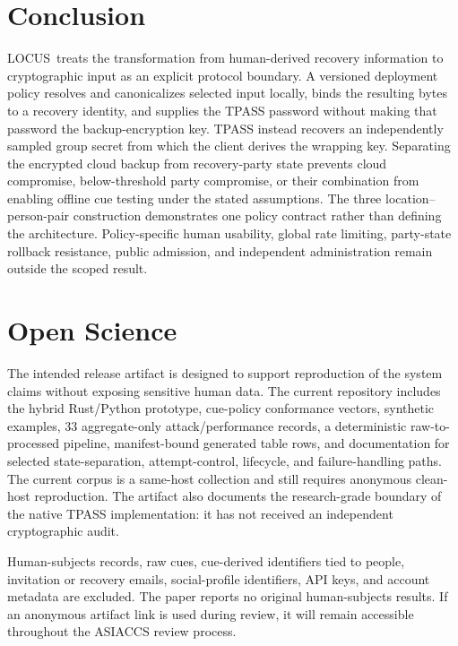 \documentclass[sigconf,anonymous]{acmart}
\newcounter{protocol}
\newcommand{\LOCUS}{\textsf{LOCUS}}
\begin{document}
\section{Conclusion}
\label{sec:conclusion}
\LOCUS\ treats the transformation from human-derived recovery information to cryptographic input as an explicit protocol boundary. A versioned deployment policy resolves and canonicalizes selected input locally, binds the resulting bytes to a recovery identity, and supplies the TPASS password without making that password the backup-encryption key. TPASS instead recovers an independently sampled group secret from which the client derives the wrapping key. Separating the encrypted cloud backup from recovery-party state prevents cloud compromise, below-threshold party compromise, or their combination from enabling offline cue testing under the stated assumptions. The three location--person-pair construction demonstrates one policy contract rather than defining the architecture. Policy-specific human usability, global rate limiting, party-state rollback resistance, public admission, and independent administration remain outside the scoped result.




\appendix

\section{Open Science}
\label{sec:open-science}

The intended release artifact is designed to support reproduction of the system claims without exposing sensitive human data. The current repository includes the hybrid Rust/Python prototype, cue-policy conformance vectors, synthetic examples, 33 aggregate-only attack/performance records, a deterministic raw-to-processed pipeline, manifest-bound generated table rows, and documentation for selected state-separation, attempt-control, lifecycle, and failure-handling paths. The current corpus is a same-host collection and still requires anonymous clean-host reproduction. The artifact also documents the research-grade boundary of the native TPASS implementation: it has not received an independent cryptographic audit.

Human-subjects records, raw cues, cue-derived identifiers tied to people, invitation or recovery emails, social-profile identifiers, API keys, and account metadata are excluded. The paper reports no original human-subjects results. If an anonymous artifact link is used during review, it will remain accessible throughout the ASIACCS review process.
\end{document}
